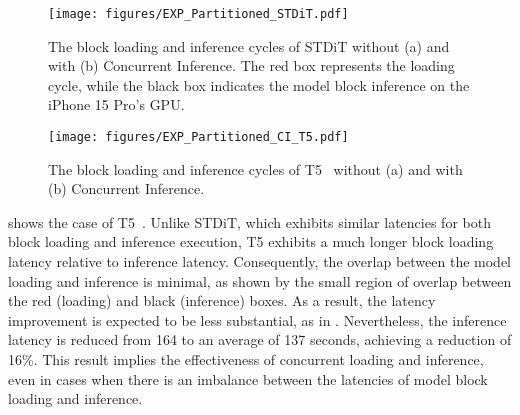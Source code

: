 {\begin{figure} [!htb]
    \centering
    \texttt{[image: figures/EXP\_Partitioned\_STDiT.pdf]}
    \caption{The block loading and inference cycles of STDiT \cite{opensora} without (a) and with (b) Concurrent Inference. The red box represents the loading cycle, while the black box indicates the model block inference on the iPhone 15 Pro's GPU.%
    }
    \label{fig:exp_partitioned_stdit}
\end{figure}

\begin{figure} [!ht]
    \centering
    \texttt{[image: figures/EXP\_Partitioned\_CI\_T5.pdf]}
    
    \caption{The block loading and inference cycles of T5~\cite{raffel2020exploring} without (a) and with (b) Concurrent Inference. %
    }
    \label{fig:exp_partitioned_ci_t5}
\vspace{-4pt}
\end{figure}

 shows the case of T5~\cite{raffel2020exploring}. Unlike STDiT, which exhibits similar latencies for both block loading and inference execution, T5 exhibits a much longer block loading latency relative to inference latency. Consequently, the overlap between the model loading and inference is minimal, as shown by the small region of overlap between the red (loading) and black (inference) boxes. As a result, the latency improvement is expected to be less substantial, as in . Nevertheless, the inference latency is reduced from 164 to an average of 137 seconds, achieving a reduction of 16\%. This result implies the effectiveness of concurrent loading and inference, even in cases when there is an imbalance between the latencies of model block loading and inference.

}
